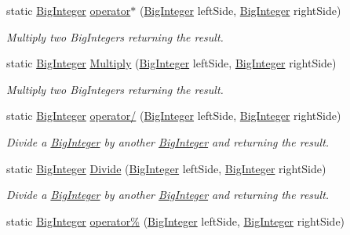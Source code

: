 \begin{DoxyCompactItemize}
static \hyperlink{class_scott_garland_1_1_big_integer}{Big\+Integer} \hyperlink{class_scott_garland_1_1_big_integer_ae893cd71c07858e3ced194d364a5c1ba}{operator$\ast$} (\hyperlink{class_scott_garland_1_1_big_integer}{Big\+Integer} left\+Side, \hyperlink{class_scott_garland_1_1_big_integer}{Big\+Integer} right\+Side)
\begin{DoxyCompactList}\small\item\em Multiply two Big\+Integers returning the result. \end{DoxyCompactList}\item 
static \hyperlink{class_scott_garland_1_1_big_integer}{Big\+Integer} \hyperlink{class_scott_garland_1_1_big_integer_a003b5c4564964f03ffa49a74bad0f4fd}{Multiply} (\hyperlink{class_scott_garland_1_1_big_integer}{Big\+Integer} left\+Side, \hyperlink{class_scott_garland_1_1_big_integer}{Big\+Integer} right\+Side)
\begin{DoxyCompactList}\small\item\em Multiply two Big\+Integers returning the result. \end{DoxyCompactList}\item 
static \hyperlink{class_scott_garland_1_1_big_integer}{Big\+Integer} \hyperlink{class_scott_garland_1_1_big_integer_a021e7c5201d241d86b1fbdc4efa3c137}{operator/} (\hyperlink{class_scott_garland_1_1_big_integer}{Big\+Integer} left\+Side, \hyperlink{class_scott_garland_1_1_big_integer}{Big\+Integer} right\+Side)
\begin{DoxyCompactList}\small\item\em Divide a \hyperlink{class_scott_garland_1_1_big_integer}{Big\+Integer} by another \hyperlink{class_scott_garland_1_1_big_integer}{Big\+Integer} and returning the result. \end{DoxyCompactList}\item 
static \hyperlink{class_scott_garland_1_1_big_integer}{Big\+Integer} \hyperlink{class_scott_garland_1_1_big_integer_a98eadd02148a503be9ca7fb7929224da}{Divide} (\hyperlink{class_scott_garland_1_1_big_integer}{Big\+Integer} left\+Side, \hyperlink{class_scott_garland_1_1_big_integer}{Big\+Integer} right\+Side)
\begin{DoxyCompactList}\small\item\em Divide a \hyperlink{class_scott_garland_1_1_big_integer}{Big\+Integer} by another \hyperlink{class_scott_garland_1_1_big_integer}{Big\+Integer} and returning the result. \end{DoxyCompactList}\item 
static \hyperlink{class_scott_garland_1_1_big_integer}{Big\+Integer} \hyperlink{class_scott_garland_1_1_big_integer_a6660cf490e242eed91928fca289e7b7f}{operator\%} (\hyperlink{class_scott_garland_1_1_big_integer}{Big\+Integer} left\+Side, \hyperlink{class_scott_garland_1_1_big_integer}{Big\+Integer} right\+Side)

\end{DoxyCompactItemize}
